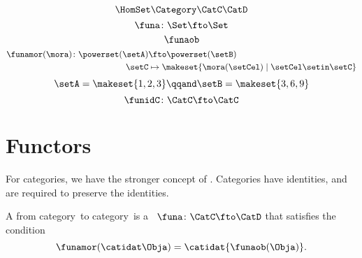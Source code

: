 {\begin{forslides}
\begin{equation}
            \HomSet\Category\CatC\CatD
        \end{equation}
        \begin{equation}
            \label{eq:pow_fun_1}
            \funa\colon \Set \fto \Set
        \end{equation}
        \begin{equation}
            \label{eq:pow_fun_2}
            \funaob
        \end{equation}
        \begin{equation}
            \label{eq:pow_fun_3}
            \begin{aligned}
                \funamor(\mora)\colon \powerset(\setA) & \fto \powerset(\setB) \\
                \setC                                  & \mapsto \makeset{ \mora(\setCel) \mid \setCel \setin \setC}
            \end{aligned}
        \end{equation}
        \begin{equation}
            \label{eq:pow_fun_4}
            \setA=\makeset{ 1,2,3} \qqand \setB=\makeset{3,6,9}
        \end{equation}
        \begin{equation}
            \label{eq:idfun}
            \funidC \colon \CatC \fto \CatC
        \end{equation}
    \end{forslides}
}

\section{Functors}
\label{sec:functors}

For categories, we have the stronger concept of .
Categories have identities, and  are required to preserve the identities.

\begin{ctdefinition}[Functor]
    \label{def:functor}
    A  from category~\CatC to category~\CatD is a ~$\funa\colon \CatC \fto \CatD$
    that satisfies the condition
    \begin{equation}
        \label{eq:functor-condition}
        \funamor(\catidat\Obja)=\catidat{\funaob(\Obja)}.
    \end{equation}
\end{ctdefinition}

